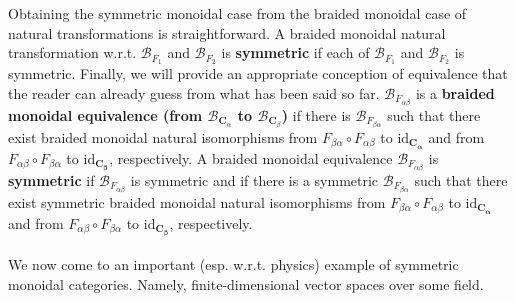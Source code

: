 Obtaining the symmetric monoidal case from the braided monoidal case of natural transformations is straightforward.
A braided monoidal natural transformation w.r.t. $\mathcal{B}_{F_{1}}$ and $\mathcal{B}_{F_{2}}$ is \textbf{symmetric} if each of $\mathcal{B}_{F_{1}}$ and $\mathcal{B}_{F_{2}}$ is symmetric.
Finally, we will provide an appropriate conception of equivalence that the reader can already guess from what has been said so far.
$\mathcal{B}_{F_{\alpha\beta}}$ is a \textbf{braided monoidal equivalence (from $\mathcal{B}_{\mathbf{C}_{\alpha}}$ to $\mathcal{B}_{\mathbf{C}_{\beta}}$)} if there is $\mathcal{B}_{F_{\beta\alpha}}$ such that there exist braided monoidal natural isomorphisms from $F_{\beta\alpha} \circ F_{\alpha\beta}$ to $\mathrm{id}_{\mathbf{C_{\alpha}}}$ and from $F_{\alpha\beta} \circ F_{\beta\alpha}$ to $\mathrm{id}_{\mathbf{C_{\beta}}}$, respectively.
A braided monoidal equivalence $\mathcal{B}_{F_{\alpha\beta}}$ is \textbf{symmetric} if $\mathcal{B}_{F_{\alpha\beta}}$ is symmetric and if there is a symmetric $\mathcal{B}_{F_{\beta\alpha}}$ such that there exist symmetric braided monoidal natural isomorphisms from $F_{\beta\alpha} \circ F_{\alpha\beta}$ to $\mathrm{id}_{\mathbf{C_{\alpha}}}$ and from $F_{\alpha\beta} \circ F_{\beta\alpha}$ to $\mathrm{id}_{\mathbf{C_{\beta}}}$, respectively.
\\\\
We now come to an important (esp. w.r.t. physics) example of symmetric monoidal categories.
Namely, finite-dimensional vector spaces over some field.
\\

